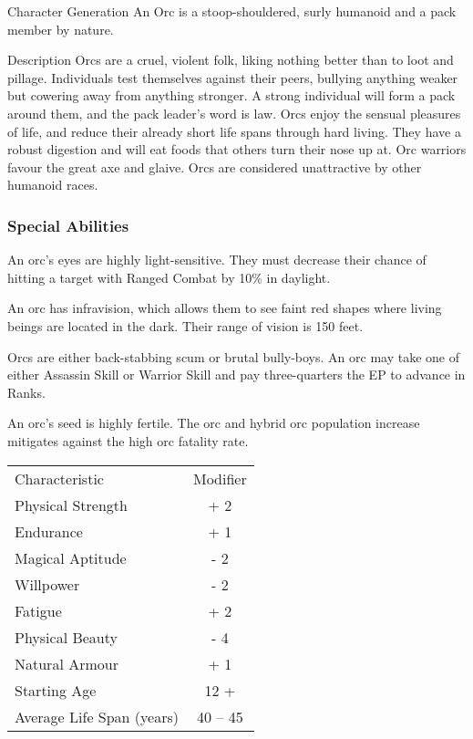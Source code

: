 \begin{Chapter}{Character Generation}
An Orc is a stoop-shouldered, surly humanoid and a pack member by
nature.

\begin{Description}
\item[Description] Orcs are a cruel, violent folk, liking nothing
  better than to loot and pillage.  Individuals test themselves
  against their peers, bullying anything weaker but cowering away from
  anything stronger.  A strong individual will form a pack around
  them, and the pack leader’s word is law.  Orcs enjoy the sensual
  pleasures of life, and reduce their already short life spans through
  hard living.  They have a robust digestion and will eat foods that
  others turn their nose up at.  Orc warriors favour the great axe and
  glaive.  Orcs are considered unattractive by other humanoid races.
\end{Description}

\subsubsection{Special Abilities}

\begin{Enumerate}
  
\item An orc’s eyes are highly light-sensitive.  They must decrease
  their chance of hitting a target with Ranged Combat by 10\% in
  daylight.

\item An orc has infravision, which allows them to see faint red
  shapes where living beings are located in the dark. Their range of
  vision is 150 feet.

\item Orcs are either back-stabbing scum or brutal bully-boys. An orc
  may take one of either Assassin Skill or Warrior Skill and pay
  three-quarters the EP to advance in Ranks.

\item An orc’s seed is highly fertile.  The orc and hybrid orc
  population increase mitigates against the high orc fatality rate.

\end{Enumerate}
  
\begin{tabularx}{\columnwidth}{Xc}
Characteristic 			& Modifier \\
Physical Strength		& + 2 \\
Endurance			& + 1 \\
Magical Aptitude		& - 2 \\
Willpower			& - 2 \\
Fatigue				& + 2 \\
Physical Beauty			& - 4 \\
Natural Armour			& + 1 \\
Starting Age			&  12 + \\
Average Life Span (years)	& 40 -- 45 \\
\end{tabularx}


\end{Chapter}
